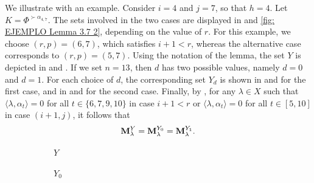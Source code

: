 \begin{example}\rm
We illustrate  with an example. 
Consider $i = 4$ and $j = 7$, so that $h = 4$. 
Let $K = \Phi^{\succ \alpha_{4,7}}$. 
The sets involved in the two cases are displayed in  and \cref{fig: EJEMPLO Lemma 3.7 2}, depending on the value of $r$. 
For this example, we choose $(r,p) = (6,7)$, which satisfies $i + 1 < r$, whereas the alternative case corresponds to $(r,p) = (5,7)$. 
Using the notation of the lemma, the set $Y$ is depicted in  and . 
If we set $n = 13$, then $d$ has two possible values, namely $d = 0$ and $d = 1$. 
For each choice of $d$, the corresponding set $Y_{d}$ is shown in  and  for the first case, and in  and  for the second case. 
Finally, by , for any $\lambda \in X$ such that $\langle \lambda, \alpha_t \rangle = 0$ for all $t \in \{6,7,9,10\}$ in case $i+1 < r$ or $\langle \lambda, \alpha_t \rangle = 0$ for all $t \in [5,10]$ in case $(i+1,j)$, it follows that
\begin{equation}
    \mathbf{M}_{\lambda}^{Y} = \mathbf{M}_{\lambda}^{Y_{0}} = \mathbf{M}_{\lambda}^{Y_{1}}.
\end{equation}
    \begin{figure}[H]
     \centering
     \begin{subfigure}[b]{0.22\textwidth}
         \centering
        {}
    \caption{ $Y$  }
    \label{fig: ExaLemma3.7A1}
     \end{subfigure}
     \begin{subfigure}[b]{0.22\textwidth}
         \centering
        {}
    \caption{$Y_{0}$}
    \label{fig: ExaLemma3.7B1}
     \end{subfigure}
     \begin{subfigure}[b]{0.22\textwidth}
         \centering
        {}

\end{subfigure}
\end{figure}
\end{example}
